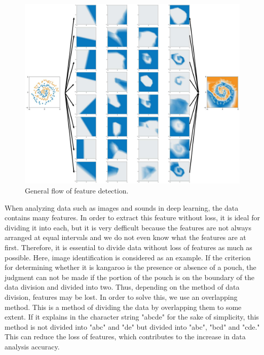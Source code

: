 \begin{figure}[t]
\begin{center}
\includegraphics[width=0.8\linewidth]{fig/C_SPIRAL_ReLU_L4xN8_overall.pdf}
\end{center}
\caption{General flow of feature detection.}
\vspace*{-3pt}
\end{figure}
When analyzing data such as images and sounds in deep learning, the data contains many features. In order to extract this feature without loss, it is ideal for dividing it into each, but it is very defficult because the features are not always arranged at equal intervals and we do not even know what the features are at first. Therefore, it is essential to divide data without loss of features as much as possible. Here, image identification is considered as an example. If the criterion for determining whether it is kangaroo is the presence or absence of a pouch, the judgment can not be made if the portion of the pouch is on the boundary of the data division and divided into two. Thus, depending on the method of data division, features may be lost. In order to solve this, we use an overlapping method. This is a method of dividing the data by overlapping them to some extent. If it explains in the character string "abcde" for the sake of simplicity, this method is not divided into "abc" and "de" but divided into "abc", "bcd" and "cde." This can reduce the loss of features, which contributes to the increase in data analysis accuracy. 

